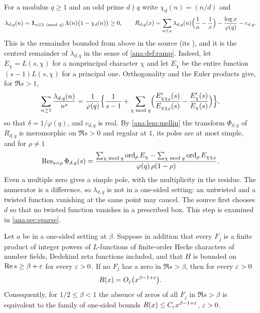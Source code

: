 \begin{example}\label{ana:ex:source}
For a modulus $q\ge1$ and an odd prime $d\nmid q$ write $\chi_d(n)=(n/d)$ and
\[
 \lambda_{d,q}(n)=\anaone_{n\equiv1\ (\mathrm{mod}\ q)}\,\Lambda(n)\bigl(1-\chi_d(n)\bigr)\ge0,\qquad
 R_{d,q}(x)=\sum_{n\le x}\lambda_{d,q}(n)\Bigl(\frac1n-\frac1x\Bigr)
 -\frac{\log x}{\varphi(q)}-c_{d,q}.
\]
This is the remainder bounded from above in the source (its ), and it is the
centred remainder of $\lambda_{d,q}$ in the sense of \cref{ana:def:ramp}. Indeed, let
$E_\chi=L(s,\chi)$ for a nonprincipal character $\chi$ and let $E_\chi$ be the entire function
$(s-1)L(s,\chi)$ for a principal one. Orthogonality and the Euler products give, for $\Re s>1$,
\[
 \sum_{n\ge1}\frac{\lambda_{d,q}(n)}{n^s}
 =\frac1{\varphi(q)}\Bigl\{\frac1{s-1}+\sum_{\chi\bmod q}
 \Bigl(\frac{E'_{\chi\chi_d}(s)}{E_{\chi\chi_d}(s)}-\frac{E'_\chi(s)}{E_\chi(s)}\Bigr)\Bigr\},
\]
so that $\delta=1/\varphi(q)$, and $c_{d,q}$ is real. By \cref{ana:lem:mellin} the transform
$\Phi_{d,q}$ of $R_{d,q}$ is meromorphic on $\Re s>0$ and regular at $1$, its poles are at most
simple, and for $\rho\ne1$
\begin{equation}\label{ana:eq:srcres}
 \operatorname{Res}_{s=\rho}\Phi_{d,q}(s)
 =\frac{\sum_{\chi\bmod q}\operatorname{ord}_\rho E_\chi-\sum_{\chi\bmod q}\operatorname{ord}_\rho E_{\chi\chi_d}}
 {\varphi(q)\,\rho(1-\rho)} .
\end{equation}
Even a multiple zero gives a simple pole, with the multiplicity in the residue. The numerator
is a difference, so $\lambda_{d,q}$ is not in a one-sided setting: an untwisted and a twisted
function vanishing at the same point may cancel. The source first chooses $d$ so that no
twisted function vanishes in a prescribed box. This step is examined in \cref{ana:sec:sparse}.
\end{example}

\begin{proposition}\label{ana:prop:converse}
Let $a$ be in a one-sided setting at $\beta$. Suppose in addition that every $F_j$ is a finite
product of integer powers of $L$-functions of finite-order Hecke characters of number fields,
Dedekind zeta functions included, and that $H$ is bounded on $\operatorname{Re} s\ge\beta+\varepsilon$ for every
$\varepsilon>0$. If no $F_j$ has a zero in $\Re s>\beta$, then for every $\varepsilon>0$
\[
 R(x)=O_\varepsilon\bigl(x^{\beta-1+\varepsilon}\bigr).
\]
Consequently, for $1/2\le\beta<1$ the absence of zeros of all $F_j$ in $\Re s>\beta$ is
equivalent to the family of one-sided bounds $R(x)\le C_\varepsilon x^{\beta-1+\varepsilon}$, $\varepsilon>0$.
\end{proposition}

